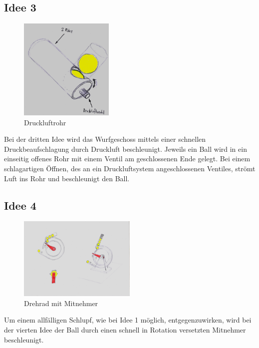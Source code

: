 \subsection{Idee 3}
\begin{figure}[h!]
	\centering
	\includegraphics[width=0.4\textwidth]{../../fig/Druckluftrohr.jpg}
	\caption{Druckluftrohr}
	\label{fig:druckluftrohr}
\end{figure}
Bei der dritten Idee wird das Wurfgeschoss mittels einer schnellen Druckbeaufschlagung durch Druckluft beschleunigt. Jeweils ein Ball wird in ein einseitig offenes Rohr mit einem Ventil am geschlossenen Ende gelegt. Bei einem schlagartigen Öffnen, des an ein Druckluftsystem angeschlossenen Ventiles, strömt Luft ins Rohr und beschleunigt den Ball.

\subsection{Idee 4}
\begin{figure}[h!]
	\centering
	\includegraphics[width=0.5\textwidth]{../../fig/Drehrad_Mitnehmer.jpg}
	\caption{Drehrad mit Mitnehmer}
	\label{fig:mitnehmerrad}
\end{figure}
Um einem allfälligen Schlupf, wie bei Idee 1 möglich, entgegenzuwirken, wird bei der vierten Idee der Ball durch einen schnell in Rotation versetzten Mitnehmer beschleunigt.

